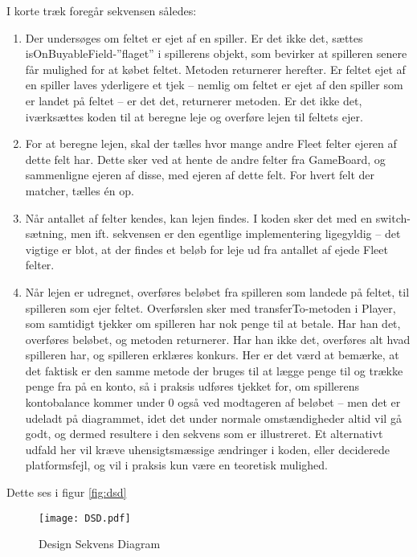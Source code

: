 I korte træk foregår sekvensen således:
\begin{enumerate}
\item Der undersøges om feltet er ejet af en spiller. Er det ikke det, sættes isOnBuyableField-”flaget” i spillerens objekt, som bevirker at spilleren senere får mulighed for at købet feltet. Metoden returnerer herefter. Er feltet ejet af en spiller laves yderligere et tjek – nemlig om feltet er ejet af den spiller som er landet på feltet – er det det, returnerer metoden. Er det ikke det, iværksættes koden til at beregne leje og overføre lejen til feltets ejer.
\item  For at beregne lejen, skal der tælles hvor mange andre Fleet felter ejeren af dette felt har. Dette sker ved at hente de andre felter fra GameBoard, og sammenligne ejeren af disse, med ejeren af dette felt. For hvert felt der matcher, tælles én op.
\item Når antallet af felter kendes, kan lejen findes. I koden sker det med en switch-sætning, men ift. sekvensen er den egentlige implementering ligegyldig – det vigtige er blot, at der findes et beløb for leje ud fra antallet af ejede Fleet felter.
\item Når lejen er udregnet, overføres beløbet fra spilleren som landede på feltet, til spilleren som ejer feltet. Overførslen sker med transferTo-metoden i Player, som samtidigt tjekker om spilleren har nok penge til at betale. Har han det, overføres beløbet, og metoden returnerer. Har han ikke det, overføres alt hvad spilleren har, og spilleren erklæres konkurs. Her er det værd at bemærke, at det faktisk er den samme metode der bruges til at lægge penge til og trække penge fra på en konto, så i praksis udføres tjekket for, om spillerens kontobalance kommer under 0 også ved modtageren af beløbet – men det er udeladt på diagrammet, idet det under normale omstændigheder altid vil gå godt, og dermed resultere i den sekvens som er illustreret. Et alternativt udfald her vil kræve uhensigtsmæssige ændringer i koden, eller deciderede platformsfejl, og vil i praksis kun være en teoretisk mulighed.
\end{enumerate}
Dette ses i figur \vref{fig:dsd}
\begin{figure}[!ht]
\centering
\texttt{[image: DSD.pdf]}
\caption[<Text for the list of figures>]{Design Sekvens Diagram}
\label{fig:dsd}
\end{figure}
\newpage